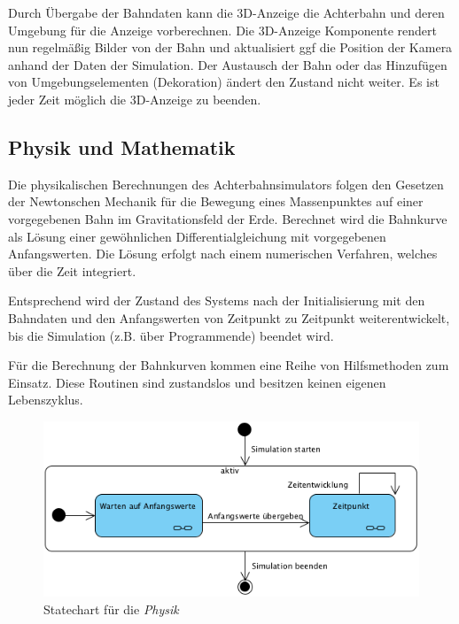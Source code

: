 Durch Übergabe der Bahndaten kann die 3D-Anzeige die Achterbahn und deren Umgebung für die Anzeige vorberechnen.
Die 3D-Anzeige Komponente rendert nun regelmäßig Bilder von der Bahn und aktualisiert ggf die Position der Kamera anhand der Daten 
der Simulation. Der Austausch der Bahn oder das Hinzufügen von Umgebungselementen (Dekoration) ändert den Zustand nicht weiter.
Es ist jeder Zeit möglich die 3D-Anzeige zu beenden.

\subsection{Physik und Mathematik}

Die physikalischen Berechnungen des Achterbahnsimulators folgen den Gesetzen der Newtonschen Mechanik für die Bewegung
eines Massenpunktes auf einer vorgegebenen Bahn im Gravitationsfeld der Erde. Berechnet wird die Bahnkurve als Lösung
einer gewöhnlichen Differentialgleichung mit vorgegebenen Anfangswerten. Die Lösung erfolgt nach einem numerischen
Verfahren, welches über die Zeit integriert.

Entsprechend wird der Zustand des Systems nach der Initialisierung mit den Bahndaten und den Anfangswerten von Zeitpunkt
zu Zeitpunkt weiterentwickelt, bis die Simulation (z.B. über Programmende) beendet wird.

Für die Berechnung der Bahnkurven kommen eine Reihe von Hilfsmethoden zum Einsatz. Diese Routinen sind zustandslos und
besitzen keinen eigenen Lebenszyklus.

\begin{figure}
\includegraphics[width=\linewidth]{bilder/StateChart_physics}
\caption{Statechart für die \textit{Physik}}
\end{figure}
